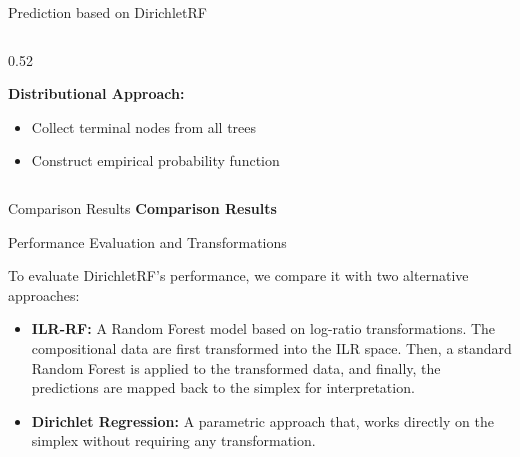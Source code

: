 \begin{frame}{Prediction based on DirichletRF}
\begin{columns}[T]
\begin{column}{0.52\textwidth}
\vspace{0.4cm}

\textbf{Distributional Approach:}
\begin{itemize}
    \item Collect terminal nodes from all trees
    \item Construct empirical probability function
\end{itemize}

\end{column}

\end{columns}

\end{frame}












\begin{frame}{Comparison Results}
      \centering
      \vfill
      \textbf{\Large Comparison Results}
      \vfill
\end{frame}

\begin{frame}{Performance Evaluation and Transformations}

To evaluate DirichletRF's performance, we compare it with two alternative approaches:
\begin{itemize}
    \item[1)] \textbf{ILR-RF:} A Random Forest model based on log-ratio transformations. 
    The compositional data are first transformed into the ILR
    space. Then, a standard Random Forest is applied to the transformed data, and 
    finally, the predictions are mapped back to the simplex for interpretation.

    \item[2)] \textbf{Dirichlet Regression:} A parametric approach that, 
    works directly on the simplex without requiring any transformation.
\end{itemize}

\end{frame}




